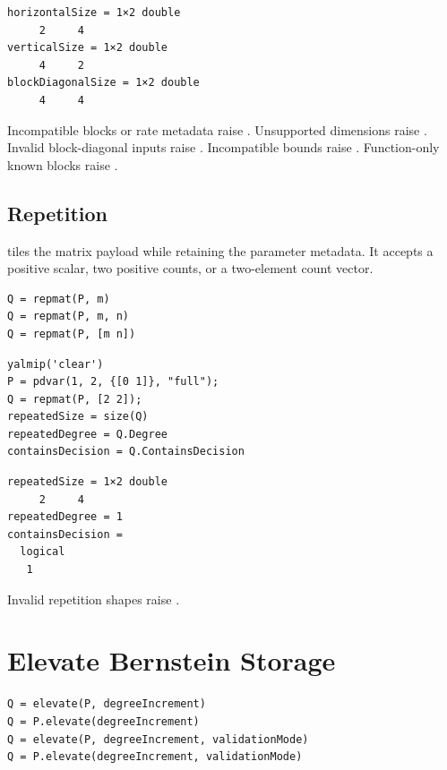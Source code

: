 \begin{lstlisting}[style=dpoutput]
horizontalSize = 1×2 double
     2     4
verticalSize = 1×2 double
     4     2
blockDiagonalSize = 1×2 double
     4     4
\end{lstlisting}

Incompatible blocks or rate metadata raise . Unsupported dimensions raise \linebreak[4]\allowbreak{}\allowbreak{}. Invalid block-diagonal inputs raise .  Incompatible bounds raise . Function-only known blocks raise \linebreak[4]\allowbreak{}\allowbreak{}.

\subsection{Repetition}

 tiles the matrix payload while retaining the parameter metadata. It accepts a positive scalar, two positive counts, or a two-element count vector.

\syntaxhead
\begin{lstlisting}[style=dpsyntax]
Q = repmat(P, m)
Q = repmat(P, m, n)
Q = repmat(P, [m n])
\end{lstlisting}

\examplehead
\begin{lstlisting}[style=dpmatlab]
yalmip('clear')
P = pdvar(1, 2, {[0 1]}, "full");
Q = repmat(P, [2 2]);
repeatedSize = size(Q)
repeatedDegree = Q.Degree
containsDecision = Q.ContainsDecision
\end{lstlisting}

\begin{lstlisting}[style=dpoutput]
repeatedSize = 1×2 double
     2     4
repeatedDegree = 1
containsDecision =
  logical
   1
\end{lstlisting}

Invalid repetition shapes raise .

\section{Elevate \texorpdfstring{}{pdvar} Bernstein Storage}
\label{sec:pdvar-elevate}

\syntaxhead
\begin{lstlisting}[style=dpsyntax]
Q = elevate(P, degreeIncrement)
Q = P.elevate(degreeIncrement)
Q = elevate(P, degreeIncrement, validationMode)
Q = P.elevate(degreeIncrement, validationMode)
\end{lstlisting}

